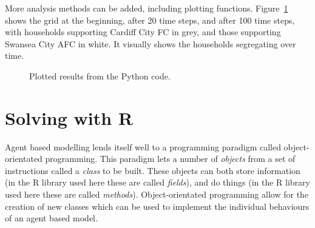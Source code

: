 More analysis methods can be added, including plotting functions.
Figure~\ref{fig:schelling_python_plot} shows the grid at the beginning, after 20
time steps, and after 100 time steps, with households supporting Cardiff City FC
in grey, and those supporting Swansea City AFC in white.
It visually shows the households segregating over time.

\begin{figure}
\begin{center}
\end{center}
\caption{Plotted results from the Python code.}
\label{fig:schelling_python_plot}
\end{figure}

\section{Solving with R}\label{sec:solving-with-R}

Agent based modelling lends itself well to a programming paradigm called
object-orientated programming.
This paradigm lets a number of \textit{objects} from a set of instructions
called a \textit{class} to be built.
These objects can both store information (in the R library used here these are called
\textit{fields}), and do things (in the R library used here these are called
\textit{methods}).
Object-orientated programming allow for the creation of new classes which can be
used to implement the individual behaviours of an agent based model.

